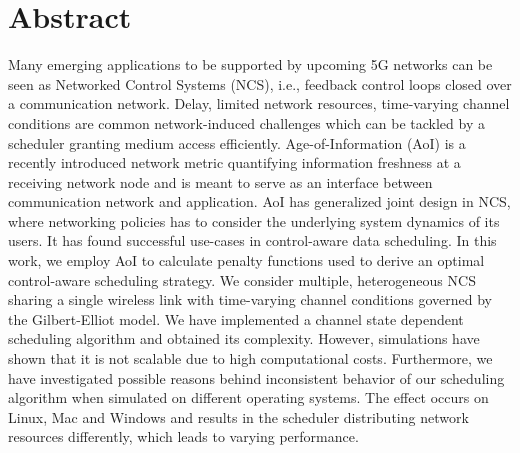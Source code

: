 \thispagestyle{plain}

\section*{Abstract}
Many emerging applications to be supported by upcoming 5G networks can be seen
as Networked Control Systems (NCS), i.e., feedback control loops closed over a
communication network. Delay, limited network resources, time-varying channel
conditions are common network-induced challenges which can be tackled by a
scheduler granting medium access efficiently. Age-of-Information (AoI) is a
recently introduced network metric quantifying information freshness at a
receiving network node and is meant to serve as an interface between
communication network and application. AoI has generalized joint design in NCS,
where networking policies has to consider the underlying system dynamics of its
users. It has found successful use-cases in control-aware data scheduling. In
this work, we employ AoI to calculate penalty functions used to derive an
optimal control-aware scheduling strategy. We consider multiple, heterogeneous
NCS sharing a single wireless link with time-varying channel conditions governed
by the Gilbert-Elliot model. We have implemented a channel state dependent
scheduling algorithm and obtained its complexity. However, simulations have
shown that it is not scalable due to high computational costs. Furthermore, we
have investigated possible reasons behind inconsistent behavior of our
scheduling algorithm when simulated on different operating systems. The effect
occurs on Linux, Mac and Windows and results in the scheduler distributing
network resources differently, which leads to varying performance.
